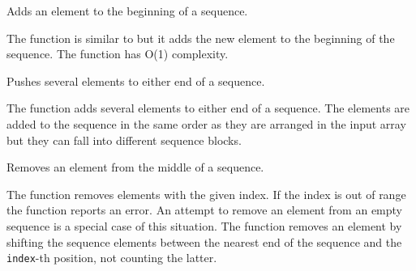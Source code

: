Adds an element to the beginning of a sequence.


\begin{description}
\end{description}

The function is similar to  but it adds the new element to the beginning of the sequence. The function has O(1) complexity.

Pushes several elements to either end of a sequence.


\begin{description}
\end{description}

The function adds several elements to either
end of a sequence. The elements are added to the sequence in the same
order as they are arranged in the input array but they can fall into
different sequence blocks.

\fi

Removes an element from the middle of a sequence.


\begin{description}
\end{description}

The function removes elements with the given
index. If the index is out of range the function reports an error. An
attempt to remove an element from an empty sequence is a special
case of this situation. The function removes an element by shifting
the sequence elements between the nearest end of the sequence and the
\texttt{index}-th position, not counting the latter.



